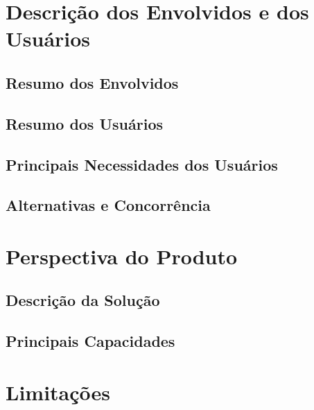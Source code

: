   \section{Descrição dos Envolvidos e dos Usuários}
    \subsection{Resumo dos Envolvidos}
    \subsection{Resumo dos Usuários}
    \subsection{Principais Necessidades dos Usuários}
    \subsection{Alternativas e Concorrência}
  \section{Perspectiva do Produto}
    \subsection{Descrição da Solução}
    \subsection{Principais Capacidades}
  \section{Limitações} 
